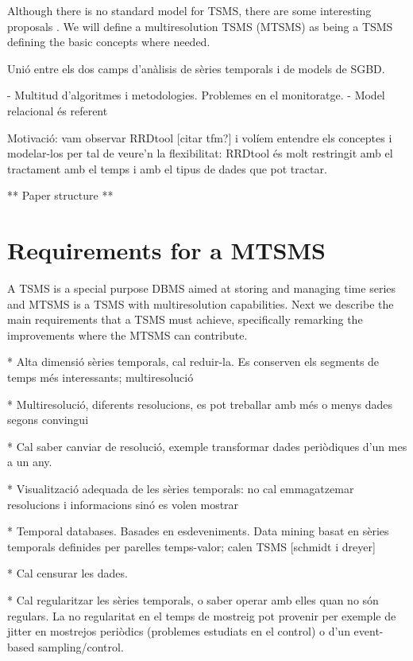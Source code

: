 Although there is no standard model for TSMS, there are some interesting proposals \cite{dreyer94,zhang11}. We will define a multiresolution TSMS (MTSMS) as being a TSMS defining the basic concepts where needed.





Unió entre els dos camps d'anàlisis de sèries temporals i de models de SGBD. 

- Multitud d'algoritmes i metodologies. Problemes en el monitoratge.
- Model relacional és referent




Motivació: vam observar RRDtool [citar tfm?] i volíem entendre els conceptes i modelar-los per tal de veure'n la flexibilitat: RRDtool és molt restringit amb el tractament amb el temps i amb el tipus de dades que pot tractar.



** Paper structure **



\section{Requirements for a MTSMS}

A TSMS is a special purpose DBMS aimed at storing and managing time
series and MTSMS is a TSMS with multiresolution capabilities. Next we
describe the main requirements that a TSMS must achieve, specifically
remarking the improvements where the MTSMS can contribute.



* Alta dimensió sèries temporals, cal reduir-la. Es conserven els segments de temps més interessants; multiresolució


* Multiresolució, diferents resolucions, es pot treballar amb més o menys dades segons convingui

* Cal saber canviar de resolució, exemple transformar dades periòdiques d'un mes a un any.

* Visualització adequada de les sèries temporals: no cal emmagatzemar resolucions i informacions sinó es volen mostrar


* Temporal databases. Basades en esdeveniments. Data mining basat en sèries temporals definides per parelles temps-valor; calen TSMS [schmidt i dreyer] 



* Cal censurar les dades.

* Cal regularitzar les sèries temporals, o saber operar amb elles quan no són regulars. La no regularitat en el temps de mostreig pot provenir per exemple de jitter en mostrejos periòdics (problemes estudiats en el control) o d'un event-based sampling/control.


